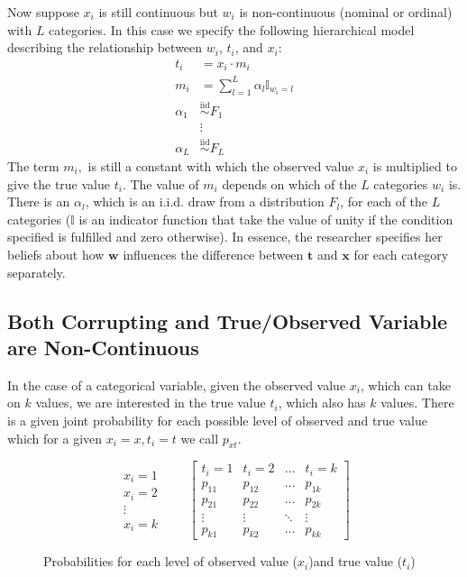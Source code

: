 \documentclass[fignum,letterpaper,12pt]{article}
\newcommand{\iid}{\stackrel{\mathrm{iid}}{\sim}}
\begin{document}
Now suppose $x_i$ is still continuous but $w_i$ is non-continuous (nominal or ordinal) with $L$ categories. In this case we specify the following hierarchical model describing the relationship between $w_i$, $t_i$, and $x_i$:
\begin{equation}
\begin{array}{rl}
t_i & = x_i \cdot m_i \\
m_{i} & = \sum_{l=1}^{L} \alpha_l \mathbb{I}_{w_i=l} \\
\alpha_1 & \iid F_1\\
& \vdots \\
\alpha_L & \iid F_L
\end{array}
\end{equation}
The term $m_i,$ is still a constant with which the observed value $x_i$ is multiplied to give the true value $t_i$. The value of $m_i$ depends on which of the $L$ categories $w_i$ is. There is an $\alpha_l$, which is an i.i.d. draw from a distribution $F_l$, for each of the $L$ categories ($\mathbb{I}$ is an indicator function that take the value of unity if the condition specified is fulfilled and zero otherwise). In essence, the researcher specifies her beliefs about how $\mathbf{w}$ influences the difference between $\mathbf{t}$ and $\mathbf{x}$ for each category separately.

\subsection{Both Corrupting and True/Observed Variable are Non-Continuous} \label{subsec:case4}

In the case of a categorical variable, given the observed value $x_i$, which can take on $k$ values, we are interested in the true value $t_i$, which also has $k$ values. There is a given joint probability for each possible level of observed and true value which for a given $x_{i}=x, t_{i}=t$ we call $p_{xt}$.
\begin{figure}
\begin{equation*}
\begin{matrix}
\\
x_{i}=1 \\
x_{i}=2 \\
\vdots \\
x_{i}=k \\

\end{matrix} \qquad
\begin{bmatrix}
t_{i}=1 & t_{i} = 2 & \hdots & t_{i} = k \\
p_{11} & p_{12} & \ldots
& p_{1k} \\
p_{21} & p_{22} & \ldots
& p_{2k} \\
\vdots & \vdots & \ddots
& \vdots \\
p_{k1} & p_{k2} & \ldots
& p_{kk}
\end{bmatrix}
\end{equation*}
\caption{Probabilities for each level of observed value ($x_{i}$)and true value ($t_{i}$)}
\end{figure}
\end{document}
